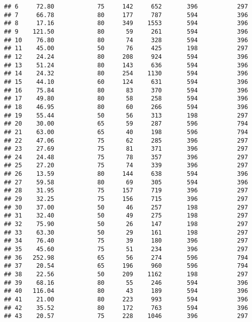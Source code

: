 \documentclass[
]{article}
\begin{document}
\begin{verbatim}
## 6     72.80            75     142     652       396           297
## 7     66.78            80     177     787       594           396
## 8     17.16            80     349    1553       594           396
## 9    121.50            80      59     261       594           396
## 10    76.80            80      74     328       594           396
## 11    45.00            50      76     425       198           297
## 12    24.24            80     208     924       594           396
## 13    51.24            80     143     636       594           396
## 14    24.32            80     254    1130       594           396
## 15    44.10            60     124     631       594           396
## 16    75.84            80      83     370       594           396
## 17    49.80            80      58     258       594           396
## 18    46.95            80      60     266       594           396
## 19    55.44            50      56     313       198           297
## 20    30.00            65      59     287       596           794
## 21    63.00            65      40     198       596           794
## 22    47.06            75      62     285       396           297
## 23    27.69            75      81     371       396           297
## 24    24.48            75      78     357       396           297
## 25    27.20            75      74     339       396           297
## 26    13.59            80     144     638       594           396
## 27    59.58            80      69     305       594           396
## 28    31.95            75     157     719       396           297
## 29    32.25            75     156     715       396           297
## 30    37.00            50      46     257       198           297
## 31    32.40            50      49     275       198           297
## 32    75.90            50      26     147       198           297
## 33    63.30            50      29     161       198           297
## 34    76.40            75      39     180       396           297
## 35    45.60            75      51     234       396           297
## 36   252.98            65      56     274       596           794
## 37    20.54            65     196     960       596           794
## 38    22.56            50     209    1162       198           297
## 39    68.16            80      55     246       594           396
## 40   116.04            80      43     189       594           396
## 41    21.00            80     223     993       594           396
## 42    35.52            80     172     763       594           396
## 43    20.57            75     228    1046       396           297

\end{verbatim}
\end{document}
